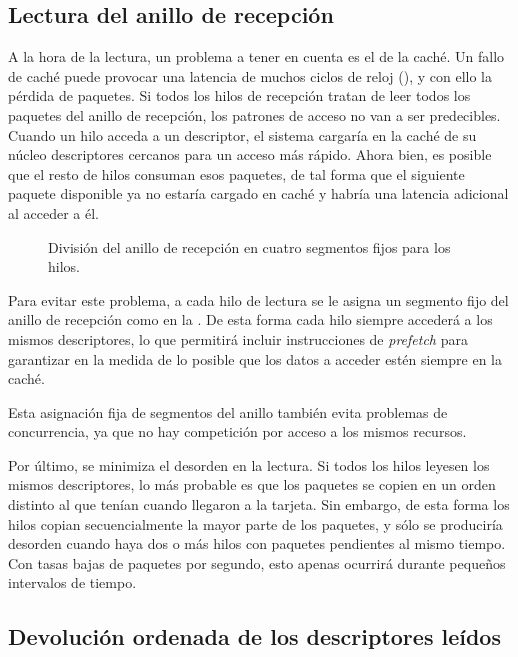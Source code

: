 \documentclass[oneside, draft]{epstfg}
\begin{document}
\subsection{Lectura del anillo de recepción}

A la hora de la lectura, un problema a tener en cuenta es el de la caché. Un fallo de caché puede provocar una latencia de muchos ciclos de reloj (), y con ello la pérdida de paquetes. Si todos los hilos de recepción tratan de leer todos los paquetes del anillo de recepción, los patrones de acceso no van a ser predecibles. Cuando un hilo acceda a un descriptor, el sistema cargaría en la caché de su núcleo descriptores cercanos para un acceso más rápido. Ahora bien, es posible que el resto de hilos consuman esos paquetes, de tal forma que el siguiente paquete disponible ya no estaría cargado en caché y habría una latencia adicional al acceder a él.

\begin{wrapfigure}[9]{R}{0.3\textwidth}
\centering
\vspace{-20pt}

\caption{División del anillo de recepción en cuatro segmentos fijos para los hilos.}
\label{fig:RingAssignment}
\end{wrapfigure}

Para evitar este problema, a cada hilo de lectura se le asigna un segmento fijo del anillo de recepción como en la . De esta forma cada hilo siempre accederá a los mismos descriptores, lo que permitirá incluir instrucciones de \textit{prefetch} para garantizar en la medida de lo posible que los datos a acceder estén siempre en la caché.

Esta asignación fija de segmentos del anillo también evita problemas de concurrencia, ya que no hay competición por acceso a los mismos recursos.

Por último, se minimiza el desorden en la lectura. Si todos los hilos leyesen los mismos descriptores, lo más probable es que los paquetes se copien en un orden distinto al que tenían cuando llegaron a la tarjeta. Sin embargo, de esta forma los hilos copian secuencialmente la mayor parte de los paquetes, y sólo se produciría desorden cuando haya dos o más hilos con paquetes pendientes al mismo tiempo. Con tasas bajas de paquetes por segundo, esto apenas ocurrirá durante pequeños intervalos de tiempo.

\subsection{Devolución ordenada de los descriptores leídos}
\end{document}
